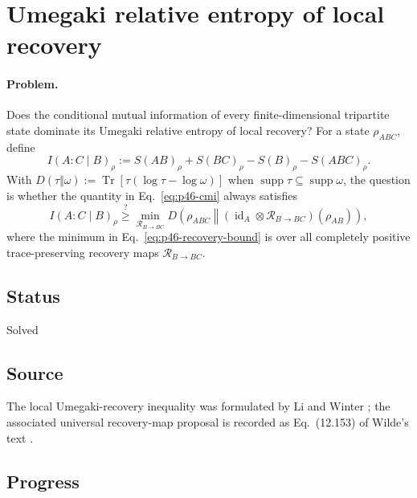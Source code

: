 \section{Umegaki relative entropy of local recovery}
\label{sec:op_8c6e6d0cc3d28e86}

\paragraph{Problem.}
Does the conditional mutual information of every finite-dimensional
tripartite state dominate its Umegaki relative entropy of local recovery?
For a state $\rho_{ABC}$, define
\begin{equation}
  I(A:C\mid B)_\rho
  :=S(AB)_\rho+S(BC)_\rho-S(B)_\rho-S(ABC)_\rho.
  \label{eq:p46-cmi}
\end{equation}
With $D(\tau\Vert\omega):=\operatorname{Tr}[\tau(\log\tau-\log\omega)]$
when $\operatorname{supp}\tau\subseteq\operatorname{supp}\omega$, the
question is whether the quantity in Eq.~\eqref{eq:p46-cmi} always satisfies
\begin{equation}
  I(A:C\mid B)_\rho
  \stackrel{?}{\ge}
  \min_{\mathcal R_{B\to BC}}
  D\!\left(
    \rho_{ABC}
    \middle\Vert
    (\operatorname{id}_A\otimes\mathcal R_{B\to BC})(\rho_{AB})
  \right),
  \label{eq:p46-recovery-bound}
\end{equation}
where the minimum in Eq.~\eqref{eq:p46-recovery-bound} is over all completely
positive trace-preserving recovery maps $\mathcal R_{B\to BC}$.

\subsection*{Status}

Solved

\subsection*{Source}

The local Umegaki-recovery inequality was formulated by Li and Winter
; the associated universal recovery-map
proposal is recorded as Eq.~(12.153) of Wilde's text
.

\subsection*{Progress}


